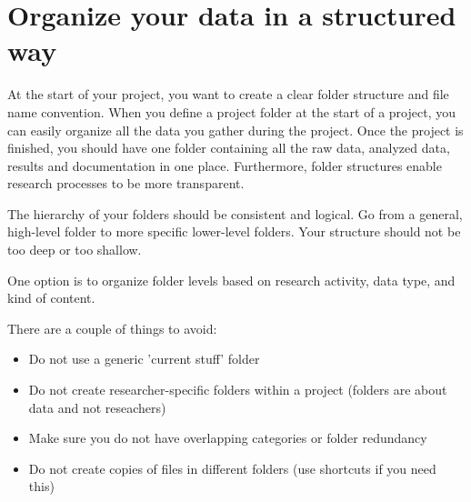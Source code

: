 \chapter{Organize your data in a structured way}
At the start of your project, you want to create a clear folder structure and file name convention. When you define a project folder at the start of a project, you can easily organize all the data you gather during the project. Once the project is finished, you should have one folder containing all the raw data, analyzed data, results and documentation in one place. Furthermore, folder structures enable research processes to be more transparent.

The hierarchy of  your folders should be consistent and logical. Go from a general, high-level folder to more specific lower-level folders. Your structure should not be too deep or too shallow. 

One option is to organize folder levels based on research activity, data type, and kind of content. 

There are a couple of things to avoid:
\begin{itemize}
	\item Do not use a generic 'current stuff' folder
	\item Do not create researcher-specific folders within a project (folders are about data and not reseachers)
	\item Make sure you do not have overlapping categories or folder redundancy
	\item Do not create copies of files in different folders (use shortcuts if you need this)
\end{itemize}

